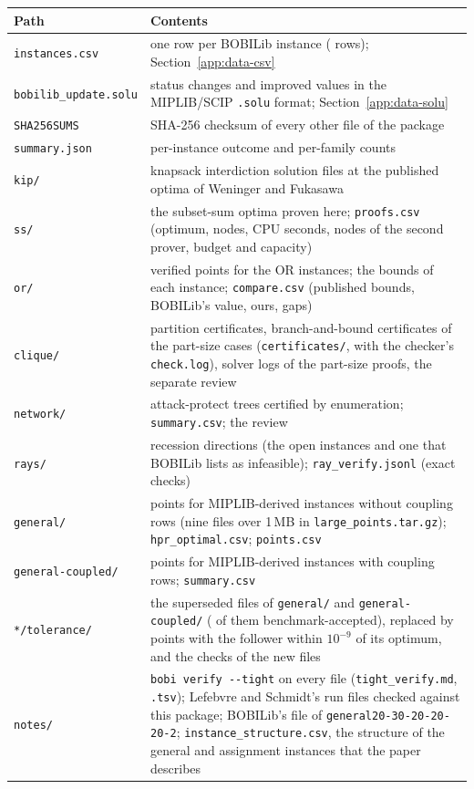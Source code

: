\begin{center}
\small
\begin{tabular}{@{}p{1.5in}p{4.8in}@{}}
\toprule
Path & Contents\\
\midrule
\texttt{instances.csv} & one row per BOBILib instance (\NumInstances{} rows); Section~\ref{app:data-csv}\\
\texttt{bobilib\_update.solu} & status changes and improved values in the MIPLIB/SCIP \texttt{.solu} format; Section~\ref{app:data-solu}\\
\texttt{SHA256SUMS} & SHA-256 checksum of every other file of the package\\
\texttt{summary.json} & per-instance outcome and per-family counts\\
\texttt{kip/} & \NumKipFiles{} knapsack interdiction solution files at the published optima of Weninger and Fukasawa\cite{weninger2025fast}\\
\texttt{ss/} & the \NumNewKip{} subset-sum optima proven here; \texttt{proofs.csv} (optimum, nodes, CPU seconds, nodes of the second prover, budget and capacity)\\
\texttt{or/} & \NumOrPoints{} verified points for the \NumOr{} OR instances; the bounds of each instance; \texttt{compare.csv} (published bounds, BOBILib's value, ours, gaps)\\
\texttt{clique/} & \NumCliqueSet{} partition certificates, branch-and-bound certificates of the \CliqueCertCases{} part-size cases (\texttt{certificates/}, with the checker's \texttt{check.log}), solver logs of the part-size proofs, the separate review\\
\texttt{network/} & \NumVerifyNetwork{} attack-protect trees certified by enumeration; \texttt{summary.csv}; the review\\
\texttt{rays/} & \NumRayFiles{} recession directions (the \NumNoFeasible{} open instances and one that BOBILib lists as infeasible); \texttt{ray\_verify.jsonl} (exact checks)\\
\texttt{general/} & \NumGeneralFiles{} points for MIPLIB-derived instances without coupling rows (nine files over 1\,MB in \texttt{large\_points.tar.gz}); \texttt{hpr\_optimal.csv}; \texttt{points.csv}\\
\texttt{general-coupled/} & \NumCoupledFiles{} points for MIPLIB-derived instances with coupling rows; \texttt{summary.csv}\\
\texttt{*/tolerance/} & the \NumTightSuperseded{} superseded files of \texttt{general/} and \texttt{general-coupled/} (\NumTightSupersededBench{} of them benchmark-accepted), replaced by points with the follower within $10^{-9}$ of its optimum, and the checks of the new files\\
\texttt{notes/} & \texttt{bobi verify -{}-tight} on every file (\texttt{tight\_verify.md}, \texttt{.tsv}); Lefebvre and Schmidt's run files checked against this package; BOBILib's file of \texttt{general20-30-20-20-20-2}; \texttt{instance\_structure.csv}, the structure of the general and assignment instances that the paper describes\\
\bottomrule
\end{tabular}
\end{center}

